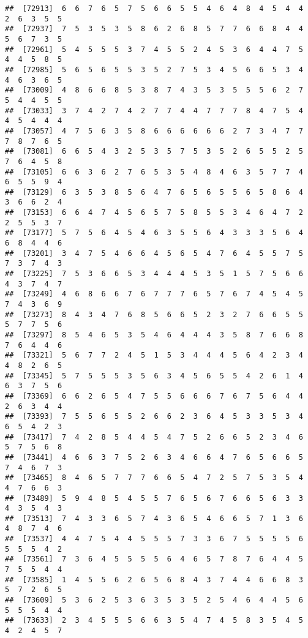 \documentclass[
]{book}
\begin{document}
\begin{verbatim}
##  [72913]  6  6  7  6  5  7  5  6  6  5  5  4  6  4  8  4  5  4  4  2  6  3  5  5
##  [72937]  7  5  3  5  3  5  8  6  2  6  8  5  7  7  6  6  8  4  4  5  6  7  3  5
##  [72961]  5  4  5  5  5  3  7  4  5  5  2  4  5  3  6  4  4  7  5  4  4  5  8  5
##  [72985]  5  6  5  6  5  5  3  5  2  7  5  3  4  5  6  6  5  3  4  4  6  3  6  5
##  [73009]  4  8  6  6  8  5  3  8  7  4  3  5  3  5  5  5  6  2  7  5  4  4  5  5
##  [73033]  3  7  4  2  7  4  2  7  7  4  4  7  7  7  8  4  7  5  4  4  5  4  4  4
##  [73057]  4  7  5  6  3  5  8  6  6  6  6  6  6  2  7  3  4  7  7  7  8  7  6  5
##  [73081]  6  6  5  4  3  2  5  3  5  7  5  3  5  2  6  5  5  2  5  7  6  4  5  8
##  [73105]  6  6  3  6  2  7  6  5  3  5  4  8  4  6  3  5  7  7  4  6  5  5  9  4
##  [73129]  6  3  5  3  8  5  6  4  7  6  5  6  5  5  6  5  8  6  4  3  6  6  2  4
##  [73153]  6  6  4  7  4  5  6  5  7  5  8  5  5  3  4  6  4  7  2  2  5  5  3  7
##  [73177]  5  7  5  6  4  5  4  6  3  5  5  6  4  3  3  3  5  6  4  6  8  4  4  6
##  [73201]  3  4  7  5  4  6  6  4  5  6  5  4  7  6  4  5  5  7  5  7  3  7  4  3
##  [73225]  7  5  3  6  6  5  3  4  4  4  5  3  5  1  5  7  5  6  6  4  3  7  4  7
##  [73249]  4  6  8  6  6  7  6  7  7  7  6  5  7  6  7  4  5  4  5  7  4  3  6  9
##  [73273]  8  4  3  4  7  6  8  5  6  6  5  2  3  2  7  6  6  5  5  5  7  7  5  6
##  [73297]  8  5  4  6  5  3  5  4  6  4  4  4  3  5  8  7  6  6  8  7  6  4  4  6
##  [73321]  5  6  7  7  2  4  5  1  5  3  4  4  4  5  6  4  2  3  4  4  8  2  6  5
##  [73345]  5  7  5  5  5  3  5  6  3  4  5  6  5  5  4  2  6  1  4  6  3  7  5  6
##  [73369]  6  6  2  6  5  4  7  5  5  6  6  6  7  6  7  5  6  4  4  2  6  3  4  4
##  [73393]  7  5  5  6  5  5  2  6  6  2  3  6  4  5  3  3  5  3  4  6  5  4  2  3
##  [73417]  7  4  2  8  5  4  4  5  4  7  5  2  6  6  5  2  3  4  6  5  7  5  6  8
##  [73441]  4  6  6  3  7  5  2  6  3  4  6  6  4  7  6  5  6  6  5  7  4  6  7  3
##  [73465]  8  4  6  5  7  7  7  6  6  5  4  7  2  5  7  5  3  5  4  4  7  6  6  3
##  [73489]  5  9  4  8  5  4  5  5  7  6  5  6  7  6  6  5  6  3  3  4  3  5  4  3
##  [73513]  7  4  3  3  6  5  7  4  3  6  5  4  6  6  5  7  1  3  6  4  8  7  4  6
##  [73537]  4  4  7  5  4  4  5  5  5  7  3  3  6  7  5  5  5  5  6  5  5  5  4  2
##  [73561]  7  3  6  4  5  5  5  5  6  4  6  5  7  8  7  6  4  4  5  7  5  5  4  4
##  [73585]  1  4  5  5  6  2  6  5  6  8  4  3  7  4  4  6  6  8  3  5  7  2  6  5
##  [73609]  5  3  6  2  5  3  6  3  5  3  5  2  5  4  6  4  4  5  6  5  5  5  4  4
##  [73633]  2  3  4  5  5  5  6  6  3  5  4  7  4  5  8  3  5  4  5  4  2  4  5  7

\end{verbatim}
\end{document}
